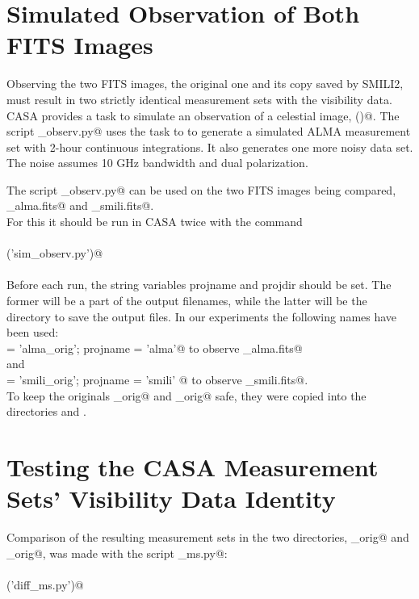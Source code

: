 \documentclass[preprint]{aastex}
\begin{document}
\section{Simulated Observation of Both FITS Images}

Observing the two FITS images, the original one and its copy saved by SMILI2, must result in two strictly identical measurement sets with the visibility data. CASA provides a task to simulate an observation of a celestial image, \verb@simobserve()@. The script \verb@sim_observ.py@ uses the task to to generate a simulated ALMA measurement set with 2-hour continuous integrations. It also generates one more noisy data set. The noise assumes 10 GHz bandwidth and dual polarization. 

The script \verb@sim_observ.py@ can be used on the two FITS images being compared, \\ \verb@RoundSpottyDisk_alma.fits@ and \verb@RoundSpottyDisk_smili.fits@. \\
For this it should be run in CASA twice with the command \\
\\
\verb@execfile('sim_observ.py')@ \\
\\
Before each run, the string variables projname and projdir should be set. The former will be a part of the output filenames, while the latter will be the directory to save the output files. In our experiments the following names have been used: \\
\verb@projdir = 'alma_orig'; projname = 'alma'@ to observe \verb@RoundSpottyDisk_alma.fits@ \\
and \\
\verb@projdir = 'smili_orig'; projname = 'smili' @  to observe \verb@RoundSpottyDisk_smili.fits@. \\

To keep the originals \verb@alma_orig@ and \verb@smili_orig@ safe, they were copied into the directories \verb@alma@ and \verb@smili@.


\section{Testing the CASA Measurement Sets' Visibility Data Identity}

Comparison of the resulting measurement sets in the two directories, \verb@alma_orig@ and \verb@smili_orig@, was made with the script \verb@diff_ms.py@: \\
\\
\verb@execfile('diff_ms.py')@ \\
\end{document}
